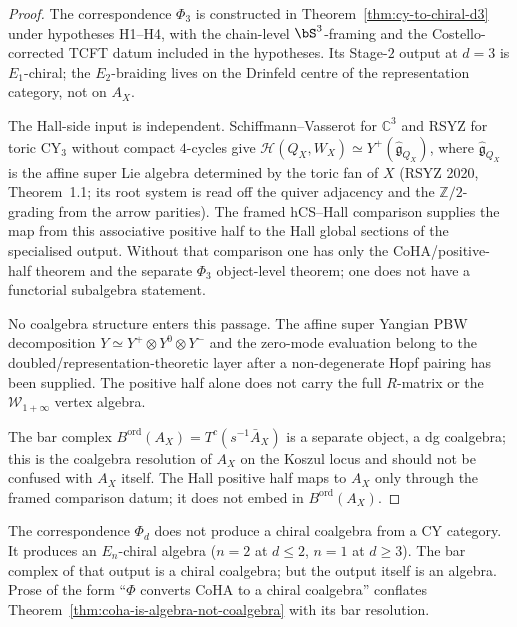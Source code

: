 \begin{proof}
The correspondence $\Phi_3$ is constructed in Theorem~\ref{thm:cy-to-chiral-d3}
under hypotheses H1--H4, with the chain-level $\bS^3$-framing and the
Costello-corrected TCFT datum included in the hypotheses. Its
Stage-$2$ output at $d=3$ is $E_1$-chiral; the $E_2$-braiding lives on
the Drinfeld centre of the representation category, not on $A_X$.

The Hall-side input is independent. Schiffmann--Vasserot for
$\mathbb C^3$ and RSYZ for toric CY$_3$ without compact $4$-cycles give
$\mathcal{H}(Q_X, W_X) \simeq
Y^+(\widehat{\mathfrak{g}}_{Q_X})$, where
$\widehat{\mathfrak{g}}_{Q_X}$ is the affine super Lie algebra
determined by the toric fan of $X$ (RSYZ 2020, Theorem~1.1; its root
system is read off the quiver adjacency and the $\mathbb{Z}/2$-grading
from the arrow parities). The framed hCS--Hall comparison supplies the
map from this associative positive half to the Hall global sections of
the specialised output. Without that comparison one has only the
CoHA/positive-half theorem and the separate $\Phi_3$ object-level
theorem; one does not have a functorial subalgebra statement.

No coalgebra structure enters this passage. The affine super Yangian
PBW decomposition
$Y \simeq Y^+ \otimes Y^0 \otimes Y^-$ and the zero-mode evaluation
belong to the doubled/representation-theoretic layer after a
non-degenerate Hopf pairing has been supplied. The positive half alone
does not carry the full $R$-matrix or the $\mathcal W_{1+\infty}$
vertex algebra.

The bar complex $B^{\mathrm{ord}}(A_X) = T^c(s^{-1} \bar A_X)$ is a
separate object, a dg coalgebra; this is the coalgebra resolution of
$A_X$ on the Koszul locus and should not be confused with $A_X$ itself.
The Hall positive half maps to $A_X$ only through the framed comparison
datum; it does not embed in $B^{\mathrm{ord}}(A_X)$.
\end{proof}

\begin{remark}
\label{rem:chiralisation-does-not}
The correspondence $\Phi_d$ does not produce a chiral coalgebra from a CY
category. It produces an $E_n$-chiral algebra ($n = 2$ at $d \leq 2$,
$n = 1$ at $d \geq 3$). The bar complex of that output is a chiral
coalgebra; but the output itself is an algebra. Prose of the form
``$\Phi$ converts CoHA to a chiral coalgebra'' conflates
Theorem~\ref{thm:coha-is-algebra-not-coalgebra} with its bar resolution.
\end{remark}

